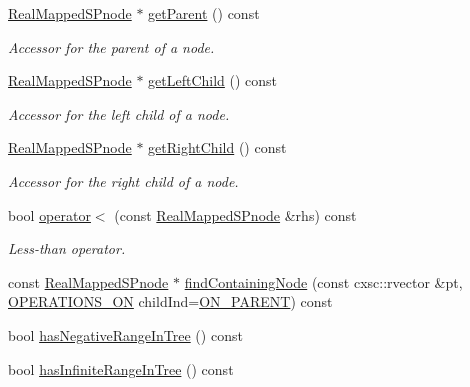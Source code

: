 \begin{DoxyCompactItemize}
\hyperlink{classsubpavings_1_1RealMappedSPnode}{\-Real\-Mapped\-S\-Pnode} $\ast$ \hyperlink{classsubpavings_1_1RealMappedSPnode_a04fef135a04c4d165c08395c531581dd}{get\-Parent} () const 
\begin{DoxyCompactList}\small\item\em \-Accessor for the parent of a node. \end{DoxyCompactList}\item 
\hyperlink{classsubpavings_1_1RealMappedSPnode}{\-Real\-Mapped\-S\-Pnode} $\ast$ \hyperlink{classsubpavings_1_1RealMappedSPnode_a71ad37450934fcd212d1c13c9f8830d4}{get\-Left\-Child} () const 
\begin{DoxyCompactList}\small\item\em \-Accessor for the left child of a node. \end{DoxyCompactList}\item 
\hyperlink{classsubpavings_1_1RealMappedSPnode}{\-Real\-Mapped\-S\-Pnode} $\ast$ \hyperlink{classsubpavings_1_1RealMappedSPnode_a19cb07beb697f0f8613a63c0b476ddd9}{get\-Right\-Child} () const 
\begin{DoxyCompactList}\small\item\em \-Accessor for the right child of a node. \end{DoxyCompactList}\item 
bool \hyperlink{classsubpavings_1_1RealMappedSPnode_a1ac4214b1e335289374edece1b5d8c43}{operator$<$} (const \hyperlink{classsubpavings_1_1RealMappedSPnode}{\-Real\-Mapped\-S\-Pnode} \&rhs) const 
\begin{DoxyCompactList}\small\item\em \-Less-\/than operator. \end{DoxyCompactList}\item 
const \hyperlink{classsubpavings_1_1RealMappedSPnode}{\-Real\-Mapped\-S\-Pnode} $\ast$ \hyperlink{classsubpavings_1_1RealMappedSPnode_a9409b660d7a7f1f35fc7f2d1904386c2}{find\-Containing\-Node} (const cxsc\-::rvector \&pt, \hyperlink{namespacesubpavings_ae1ea349cda4812634df03761ebfc1c98}{\-O\-P\-E\-R\-A\-T\-I\-O\-N\-S\-\_\-\-O\-N} child\-Ind=\hyperlink{namespacesubpavings_ae1ea349cda4812634df03761ebfc1c98a4863db89a4712e90bb113f9acf898781}{\-O\-N\-\_\-\-P\-A\-R\-E\-N\-T}) const 
\item 
bool \hyperlink{classsubpavings_1_1RealMappedSPnode_ac4cadaec6d96f2a315218dc16a082f8a}{has\-Negative\-Range\-In\-Tree} () const 
\item 
bool \hyperlink{classsubpavings_1_1RealMappedSPnode_a738f4ef504214f9dd3a533f052f6d4cb}{has\-Infinite\-Range\-In\-Tree} () const 

\end{DoxyCompactItemize}
